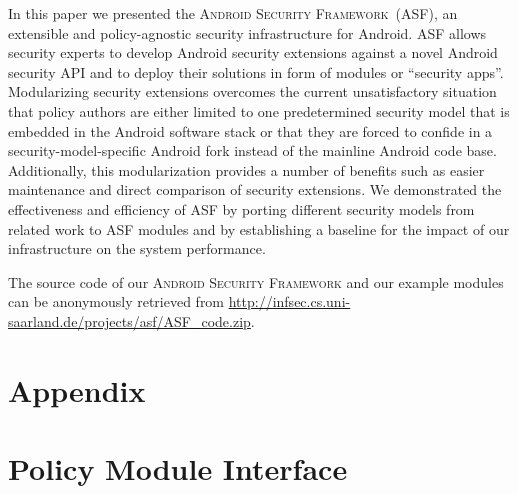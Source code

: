 \documentclass[letterpaper,twocolumn,10pt]{article}
\newcommand{\OURNAME}{\textsc{Android Security Framework}\xspace}
\newcommand{\OURSHORT}{\textsc{ASF}\xspace}
\begin{document}
In this paper we presented the \OURNAME~(\OURSHORT), an extensible and policy-agnostic security infrastructure for Android. \OURSHORT allows security experts to develop Android security extensions against a novel Android security API and to deploy their solutions in form of modules or ``security apps''. Modularizing security extensions overcomes the current unsatisfactory situation that policy authors are either limited to one predetermined security model that is embedded in the Android software stack or that they are forced to confide in a security-model-specific Android fork instead of the mainline Android code base. Additionally, this modularization provides a number of benefits such as easier maintenance and direct comparison of security extensions. We demonstrated the effectiveness and efficiency of \OURSHORT by porting different security models from related work to \OURSHORT modules and by establishing a baseline for the impact of our infrastructure on the system performance.

The source code of our \OURNAME and our example modules can be anonymously retrieved from \url{http://infsec.cs.uni-saarland.de/projects/asf/ASF_code.zip}.


{\footnotesize 
}

\appendix

\onecolumn

\section*{Appendix}

\section{Policy Module Interface}
\label{sec:appendix:api}
\end{document}
